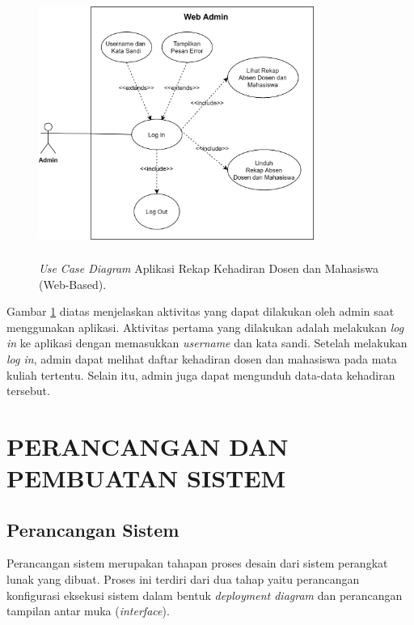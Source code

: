 \begin{figure}[H]
	\center
	\shadowbox
	{\includegraphics [width=9cm, height=8cm]{gambar/model/use-case-admin}}
	\caption{\textit{Use Case Diagram} Aplikasi Rekap Kehadiran Dosen dan Mahasiswa (Web-Based).}
	\label{usecaseadmin}
\end{figure}

\par Gambar \ref{usecaseadmin} diatas menjelaskan aktivitas yang dapat dilakukan oleh admin saat menggunakan aplikasi. Aktivitas pertama yang dilakukan adalah melakukan \textit{log in} ke aplikasi dengan memasukkan \textit{username} dan kata sandi. Setelah melakukan \textit{log in}, admin dapat melihat daftar kehadiran dosen dan mahasiswa pada mata kuliah tertentu. Selain itu, admin juga dapat mengunduh data-data kehadiran tersebut.



\section{\uppercase{PERANCANGAN DAN PEMBUATAN SISTEM}}

\subsection{Perancangan Sistem}
\par Perancangan sistem merupakan tahapan proses desain dari sistem perangkat lunak yang dibuat. Proses ini terdiri dari dua tahap yaitu perancangan konfigurasi eksekusi sistem dalam bentuk \textit{deployment diagram} dan perancangan tampilan antar muka (\textit{interface}).


